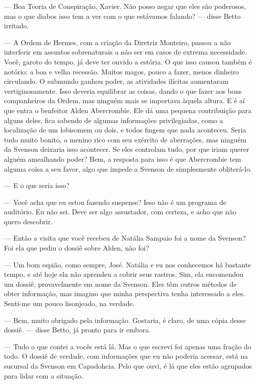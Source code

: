 --- Boa Teoria de Conspiração, Xavier. Não posso negar que eles são
poderosos, mas o que diabos isso tem a ver com o que estávamos falando?
--- disse Betto irritado.

--- A Ordem de Hermes, com a criação da Diretriz Monteiro, passou a não
interferir em assuntos sobrenaturais a não ser em casos de extrema
necessidade. Você, garoto do tempo, já deve ter ouvido a estória. O que
isso causou também é notório: a boa e velha recessão. Muitos magos,
pouco a fazer, menos dinheiro circulando. O submundo ganhou poder, as
atividades ilícitas aumentaram vertiginosamente. Isso deveria equilibrar
as coisas, dando o que fazer aos bons companheiros da Ordem, mas ninguém
mais se importava àquela altura. E é aí que entra o benfeitor Alden
Abercrombie. Ele dá uma pequena contribuição para alguns deles, fica
sabendo de algumas informações privilegiadas, como a localização de um
lobisomem ou dois, e todos fingem que nada aconteceu. Seria tudo muito
bonito, o menino rico com seu exército de aberrações, mas ninguém da
Svenson deixaria isso acontecer. Se eles controlam tudo, por que iriam
querer alguém amealhando poder? Bem, a resposta para isso é que
Abercrombie tem alguma coisa a seu favor, algo que impede a Svenson de
simplesmente obliterá-lo.

--- E o que seria isso?

--- Você acha que eu estou fazendo suspense? Isso não é um programa de
auditório. Eu não sei. Deve ser algo assustador, com certeza, e acho que
não quero descobrir.

--- Então a visita que você recebeu de Natália Sampaio foi a nome da
Svenson? Foi ela que pediu o dossiê sobre Alden, não foi?

--- Um bom espião, como sempre, José. Natália e eu nos conhecemos há
bastante tempo, e até hoje ela não aprendeu a cobrir seus rastros. Sim,
ela encomendou um dossiê, provavelmente em nome da Svenson. Eles têm
outros métodos de obter informação, mas imagino que minha perspectiva
tenha interessado a eles. Senti-me um pouco lisonjeado, na verdade.

--- Bem, muito obrigado pela informação. Gostaria, é claro, de uma cópia
desse dossiê. --- disse Betto, já pronto para ir embora.

--- Tudo o que contei a vocês está lá. Mas o que escrevi foi apenas uma
fração do todo. O dossiê de verdade, com informações que eu não poderia
acessar, está na sucursal da Svenson em Capadohcia. Pelo que ouvi, é lá
que eles estão agrupados para lidar com a situação.

